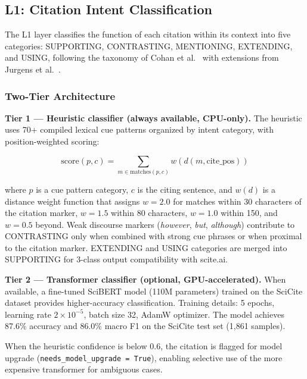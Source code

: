 \documentclass[sigconf,nonacm]{acmart}
\begin{document}
\subsection{L1: Citation Intent Classification}
\label{sec:l1}

The L1 layer classifies the function of each citation within its context into five categories: SUPPORTING, CONTRASTING, MENTIONING, EXTENDING, and USING, following the taxonomy of Cohan et al.\ \cite{cohan2019structural} with extensions from Jurgens et al.\ \cite{jurgens2018measuring}.

\subsubsection{Two-Tier Architecture}

\textbf{Tier 1 --- Heuristic classifier (always available, CPU-only).}
The heuristic uses 70+ compiled lexical cue patterns organized by intent category, with position-weighted scoring:

\begin{equation}
\text{score}(p, c) = \sum_{m \in \text{matches}(p, c)} w(d(m, \text{cite\_pos}))
\label{eq:intent}
\end{equation}

\noindent where $p$ is a cue pattern category, $c$ is the citing sentence, and $w(d)$ is a distance weight function that assigns $w = 2.0$ for matches within 30 characters of the citation marker, $w = 1.5$ within 80 characters, $w = 1.0$ within 150, and $w = 0.5$ beyond.
Weak discourse markers (\emph{however}, \emph{but}, \emph{although}) contribute to CONTRASTING only when combined with strong cue phrases or when proximal to the citation marker.
EXTENDING and USING categories are merged into SUPPORTING for 3-class output compatibility with scite.ai.

\textbf{Tier 2 --- Transformer classifier (optional, GPU-accelerated).}
When available, a fine-tuned SciBERT model (110M parameters) trained on the SciCite dataset \cite{cohan2019structural} provides higher-accuracy classification.
Training details: 5 epochs, learning rate $2 \times 10^{-5}$, batch size 32, AdamW optimizer.
The model achieves 87.6\% accuracy and 86.0\% macro F1 on the SciCite test set (1,861 samples).

When the heuristic confidence is below 0.6, the citation is flagged for model upgrade (\texttt{needs\_model\_upgrade = True}), enabling selective use of the more expensive transformer for ambiguous cases.
\end{document}
